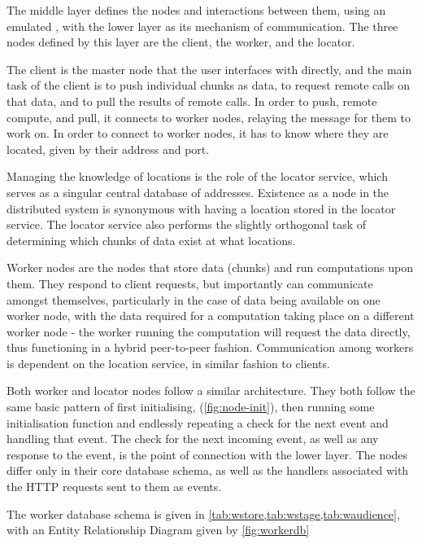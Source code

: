 The middle layer \chunknet{} defines the nodes and interactions between them, using an emulated , with the lower \orcv{} layer as its mechanism of communication.
The three nodes defined by this layer are the client, the worker, and the locator.

The client is the master node that the user interfaces with directly, and the main task of the client is to push individual chunks as data, to request remote calls on that data, and to pull the results of remote calls.
In order to push, remote compute, and pull, it connects to worker nodes, relaying the message for them to work on.
In order to connect to worker nodes, it has to know where they are located, given by their address and port.

Managing the knowledge of locations is the role of the locator service, which serves as a singular central database of addresses.
Existence as a node in the distributed system is synonymous with having a location stored in the locator service.
The locator service also performs the slightly orthogonal task of determining which chunks of data exist at what locations.

Worker nodes are the nodes that store data (chunks) and run computations upon them.
They respond to client requests, but importantly can communicate amongst themselves, particularly in the case of data being available on one worker node, with the data required for a computation taking place on a different worker node - the worker running the computation will request the data directly, thus functioning in a hybrid peer-to-peer fashion.
Communication among workers is dependent on the location service, in similar fashion to clients.

Both worker and locator nodes follow a similar architecture.
They both follow the same basic pattern of first initialising, (\cref{fig:node-init}), then running some initialisation function and endlessly repeating a check for the next event and handling that event.
The check for the next incoming event, as well as any response to the event, is the point of connection with the lower \orcv{} layer.
The nodes differ only in their core database schema, as well as the handlers associated with the HTTP requests sent to them as events.

The worker database schema is given in \cref{tab:wstore,tab:wstage,tab:waudience}, with an Entity Relationship Diagram given by \cref{fig:workerdb}


